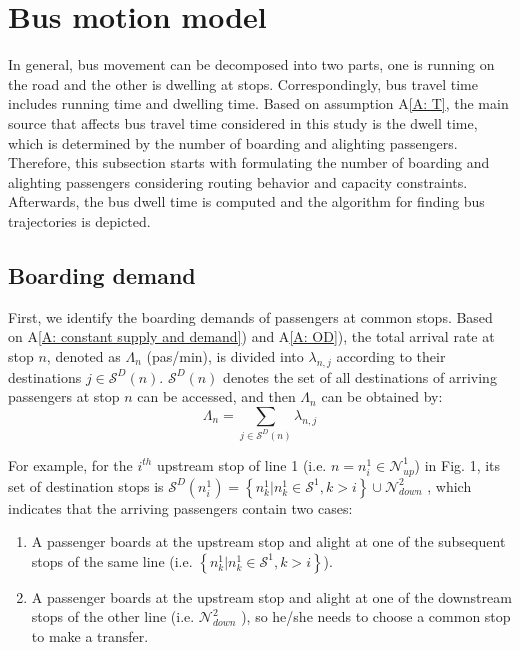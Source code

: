 \documentclass[smallextended]{svjour3}       %
\begin{document}
\begin{Abstract}
\begin{table}[H]
\begin{tabular}{p{1.5cm}p{7cm}p{1.1cm}}
\end{tabular}
\end{table}

\section{Bus motion model}\label{Bus movement}
In general, bus movement can be decomposed into two parts, one is running on the road and the other is dwelling at stops. Correspondingly, bus travel time includes running time and dwelling time.
Based on assumption A\ref{A: T}, the main source that affects bus travel time considered in this study is the dwell time, which is determined by the number of boarding and alighting passengers. 
Therefore, this subsection starts with formulating the number of boarding and alighting passengers considering routing behavior and capacity constraints. Afterwards, the bus dwell time is computed and the algorithm for finding bus trajectories is depicted.

\subsection{Boarding demand}\label{B}
First, we identify the boarding demands of passengers at common stops.
Based on A\ref{A: constant supply and demand}) and A\ref{A: OD}), 
the total arrival rate at stop $n$, denoted as $\Lambda_{n}$ (pas/min), 
is divided into $\lambda_{n,j}$ 
according to their destinations $j\in \mathcal{S}^{D}(n)$.
$\mathcal{S}^{D}\left( n \right)$ denotes the set of all destinations of arriving passengers 
at stop $n$ can be accessed,
and then $\Lambda_{n}$ can be obtained by:
\begin{equation}
    \label{equ:sumLambda}
    \Lambda_{n} = \sum_{j \in \mathcal{S}^{D}\left( n \right)} \lambda_{n,j} 
\end{equation}

For example, for the $i^{th}$ upstream stop of line 1
(i.e. $n=n^{1}_{i} \in \mathcal{N}_{up}^{1}$) in \textup{Fig. 1}, 
its set of destination stops is 
$\mathcal{S}^{D}\left( n^{1}_{i} \right) = 
\left\{ n^{1}_{k}|n^{1}_{k} \in \mathcal{S}^{1},k > i \right\}
\cup \mathcal{N}_{down}^{2}$ , 
which indicates that the arriving passengers contain two cases:
\begin{enumerate}[1)]
    \item A passenger boards at the upstream stop and alight 
    at one of the subsequent stops of the same line 
    (i.e. $\left\{ n^{1}_{k}|n^{1}_{k} \in \mathcal{S}^{1},k > i \right\}$).
    \item A passenger boards at the upstream stop and alight at one of the downstream stops of the other line 
    (i.e. $\mathcal{N}_{down}^{2}$ ), 
    so he/she needs to choose a common stop to make a transfer.
\end{enumerate}


\end{Abstract}
\end{document}
